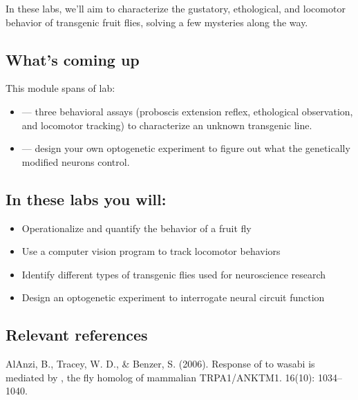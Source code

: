 \documentclass[letterpaper,10pt,english]{jupyterBook}
\begin{document}
\sphinxAtStartPar
In these labs, we’ll aim to characterize the gustatory, ethological, and locomotor behavior of transgenic fruit flies, solving a few mysteries along the way.


\subsection{What’s coming up}
\label{\detokenize{Drosophila/Introduction:what-s-coming-up}}
\sphinxAtStartPar
This module spans  of lab:
\begin{itemize}
\item {} 
\sphinxAtStartPar
{} — three behavioral assays (proboscis extension reflex, ethological observation, and locomotor tracking) to characterize an unknown transgenic line.

\item {} 
\sphinxAtStartPar
{} — design your own optogenetic experiment to figure out what the genetically modified neurons control.

\end{itemize}


\subsection{In these labs you will:}
\label{\detokenize{Drosophila/Introduction:in-these-labs-you-will}}\begin{itemize}
\item {} 
\sphinxAtStartPar
Operationalize and quantify the behavior of a fruit fly

\item {} 
\sphinxAtStartPar
Use a computer vision program to track locomotor behaviors

\item {} 
\sphinxAtStartPar
Identify different types of transgenic flies used for neuroscience research

\item {} 
\sphinxAtStartPar
Design an optogenetic experiment to interrogate neural circuit function

\end{itemize}


\subsection{Relevant references}
\label{\detokenize{Drosophila/Introduction:relevant-references}}
\sphinxAtStartPar
Al\sphinxhyphen{}Anzi, B., Tracey, W. D., \& Benzer, S. (2006). Response of  to wasabi is mediated by , the fly homolog of mammalian TRPA1/ANKTM1.  16(10): 1034–1040.
\end{document}
